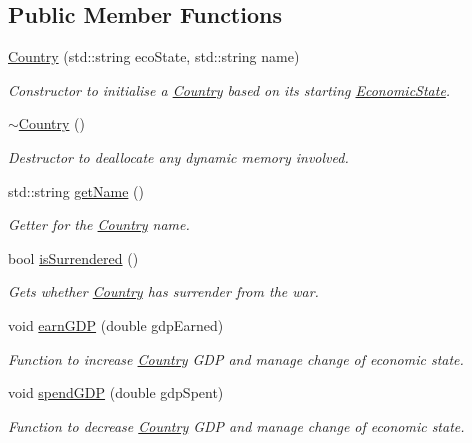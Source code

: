 \subsection*{Public Member Functions}
\begin{DoxyCompactItemize}
\item 
\mbox{\hyperlink{class_country_a04fa29f8caa2b8dcf72b89d43687aa34}{Country}} (std\+::string eco\+State, std\+::string name)
\begin{DoxyCompactList}\small\item\em Constructor to initialise a \mbox{\hyperlink{class_country}{Country}} based on its starting \mbox{\hyperlink{class_economic_state}{Economic\+State}}. \end{DoxyCompactList}\item 
\mbox{\hyperlink{class_country_a5013557e0d93fabc976bfa0d7f0564a3}{$\sim$\+Country}} ()
\begin{DoxyCompactList}\small\item\em Destructor to deallocate any dynamic memory involved. \end{DoxyCompactList}\item 
std\+::string \mbox{\hyperlink{class_country_aa584ff75674728736d4952b32693501a}{get\+Name}} ()
\begin{DoxyCompactList}\small\item\em Getter for the \mbox{\hyperlink{class_country}{Country}} name. \end{DoxyCompactList}\item 
bool \mbox{\hyperlink{class_country_a5bef51b05acceb350babfd766f2f9752}{is\+Surrendered}} ()
\begin{DoxyCompactList}\small\item\em Gets whether \mbox{\hyperlink{class_country}{Country}} has surrender from the war. \end{DoxyCompactList}\item 
void \mbox{\hyperlink{class_country_af7a71e97969c6d107831785e868e2649}{earn\+G\+DP}} (double gdp\+Earned)
\begin{DoxyCompactList}\small\item\em Function to increase \mbox{\hyperlink{class_country}{Country}} G\+DP and manage change of economic state. \end{DoxyCompactList}\item 
void \mbox{\hyperlink{class_country_ad39ce8ab2c88a4ff7e09d3fcab56f558}{spend\+G\+DP}} (double gdp\+Spent)
\begin{DoxyCompactList}\small\item\em Function to decrease \mbox{\hyperlink{class_country}{Country}} G\+DP and manage change of economic state. \end{DoxyCompactList}\item 

\end{DoxyCompactItemize}
